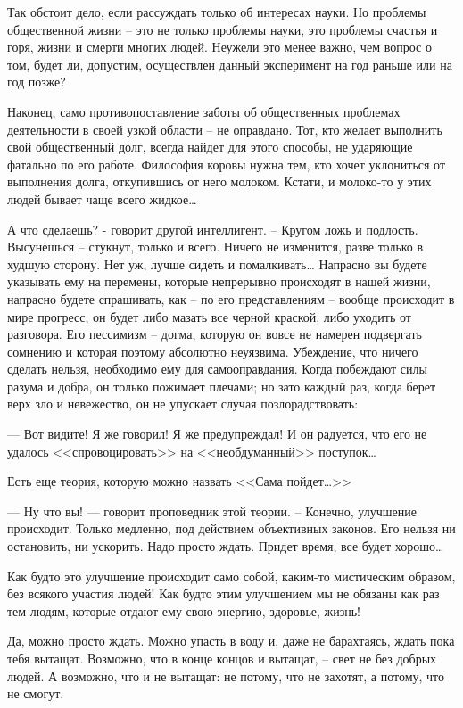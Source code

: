 \documentclass{book}
\begin{document}
Так обстоит дело, если рассуждать только об интересах науки. Но проблемы общественной жизни -- это не только проблемы науки, это проблемы счастья и горя, жизни и смерти многих людей. Неужели это менее важно, чем вопрос о том, будет ли, допустим, осуществлен данный эксперимент на год раньше или на год позже?

Наконец, само противопоставление заботы об общественных проблемах деятельности в своей узкой области -- не оправдано. Тот, кто желает выполнить свой общественный долг, всегда найдет для этого способы, не ударяющие фатально по его ра­боте. Философия коровы нужна тем, кто хочет уклониться от выполнения долга, откупившись от него молоком. Кстати, и молоко-то у этих людей бывает чаще всего жидкое\ldots

А что сделаешь? - говорит другой интеллигент. -- Кругом ложь и подлость. Высунешься -- стукнут, только и всего. Ни­чего не изменится, разве только в худшую сторону. Нет уж, лучше сидеть и помалкивать\ldots
Напрасно вы будете указывать ему на перемены, которые непрерывно происходят в нашей жизни, напрасно будете спра­шивать, как -- по его представлениям -- вообще происходит в мире прогресс, он будет либо мазать все черной краской, либо уходить от разговора. Его пессимизм -- догма, которую он вовсе не намерен подвергать сомнению и которая поэтому абсолютно неуязвима. Убеждение, что ничего сделать нельзя, необходимо ему для самооправдания. Когда побеждают силы разума и добра, он только пожимает плечами; но зато каж­дый раз, когда берет верх зло и невежество, он не упускает случая позлорадствовать:

--- Вот видите! Я же говорил! Я же предупреждал! И он радуется, что его не удалось <<спровоцировать>> на <<не­обдуманный>> поступок\ldots

Есть еще теория, которую можно назвать <<Сама пойдет\ldots>>

--- Ну что вы! --- говорит проповедник этой теории. -- Конеч­но, улучшение происходит. Только медленно, под действием объективных законов. Его нельзя ни остановить, ни ускорить. Надо просто ждать. Придет время, все будет хорошо\ldots

Как будто это улучшение происходит само собой, каким-то мистическим образом, без всякого участия людей! Как будто этим улучшением мы не обязаны как раз тем людям, которые отдают ему свою энергию, здоровье, жизнь!

Да, можно просто ждать. Можно упасть в воду и, даже не барахтаясь, ждать пока тебя вытащат. Возможно, что в конце концов и вытащат, -- свет не без добрых людей. А возможно, что и не вытащат: не потому, что не захотят, а потому, что не смогут.
\end{document}
